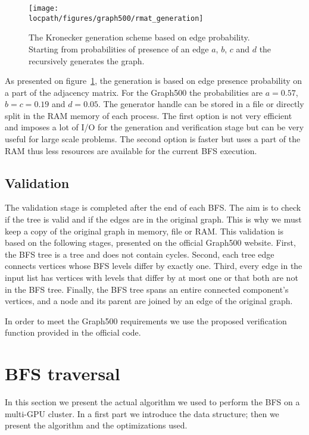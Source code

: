 \begin{figure}[!t]
	\centering
	\texttt{[image: \\locpath/figures/graph500/rmat\_generation]}
	\caption[Kronecker scheme to generate the graph]{The Kronecker generation scheme based on edge probability. Starting from probabilities of presence of an edge $a$, $b$, $c$ and $d$ the recursively generates the graph.}
	\label{fig:kron_gen_scheme}
\end{figure}

As presented on figure~\ref{fig:kron_gen_scheme}, the generation is based on edge presence probability on a part of the adjacency matrix. 
For the Graph500 the probabilities are $a = 0.57$, $b = c = 0.19$ and $d = 0.05$.
The generator handle can be stored in a file or directly split in the RAM memory of each process. 
The first option is not very efficient and imposes a lot of I/O for the generation and verification stage but can be very useful for large scale problems.
The second option is faster but uses a part of the RAM thus less resources are available for the current BFS execution.


\subsection{Validation}
The validation stage is completed after the end of each BFS. 
The aim is to check if the tree is valid and if the edges are in the original graph.
 This is why we must keep a copy of the original graph in memory, file or RAM. 
This validation is based on the following stages, presented on the official Graph500 website.
First, the BFS tree is a tree and does not contain cycles.
Second, each tree edge connects vertices whose BFS levels differ by exactly one.
Third, every edge in the input list has vertices with levels that differ by at most one or that both are not in the BFS tree.
Finally, the BFS tree spans an entire connected component's vertices, and
a node and its parent are joined by an edge of the original graph.

In order to meet the Graph500 requirements we use the proposed verification function provided in the official code.

\section{BFS traversal}
In this section we present the actual algorithm we used to perform the BFS on a multi-GPU cluster. 
In a first part we introduce the data structure; then we present the algorithm and the optimizations used.

